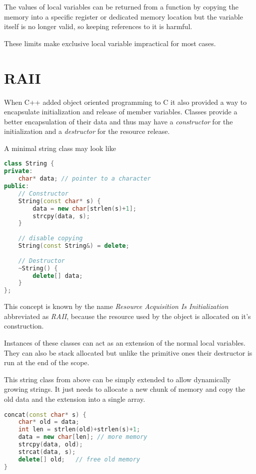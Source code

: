 \documentclass[conference,twocolumn]{IEEEtran}
\begin{document}
The values of local variables can be returned from a function by copying the memory into a specific register or dedicated memory location but the variable itself is no longer valid, so keeping references to it is harmful.

These limits make exclusive local variable impractical for most cases.

\section{RAII}
When C++ added object oriented programming to C it also provided a way to encapsulate initialization and release of member variables. Classes provide a better encapsulation of their data and thus may have a \emph{constructor} for the initialization and a \emph{destructor} for the resource release. \cite{stroustrupFoundationsCpp}

\pagebreak

A minimal string class may look like
\begin{lstlisting}[language=c++,frame=single]
class String {
private:
    char* data; // pointer to a character
public:
    // Constructor
    String(const char* s) {
        data = new char[strlen(s)+1];
        strcpy(data, s);
    }
    
    // disable copying
    String(const String&) = delete;
    
    // Destructor
    ~String() {
        delete[] data;
    }
};
\end{lstlisting}

This concept is known by the name \emph{Resource Acquisition Is Initialization} abbreviated as \emph{RAII}, because the resource used by the object is allocated on it's construction.

Instances of these classes can act as an extension of the normal local variables. They can also be stack allocated but unlike the primitive ones their destructor is run at the end of the scope.

This string class from above can be simply extended to allow dynamically growing strings. It just needs to allocate a new chunk of memory and copy the old data and the extension into a single array.

\begin{lstlisting}[language=c++, frame=single]
concat(const char* s) {
    char* old = data;
    int len = strlen(old)+strlen(s)+1;
    data = new char[len]; // more memory
    strcpy(data, old);
    strcat(data, s);
    delete[] old;	// free old memory
}
\end{lstlisting}
\end{document}
